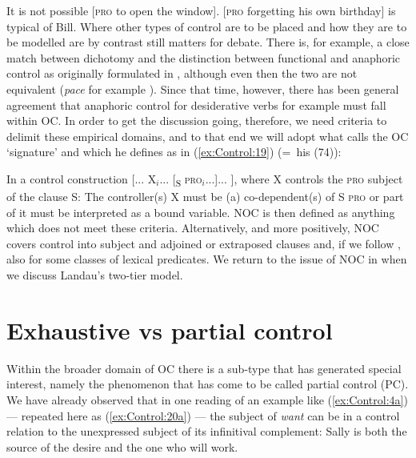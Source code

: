 \documentclass[output=paper,hidelinks]{langscibook}
\begin{document}
\ea\label{ex:Control:18}
\ea\label{ex:Control:18a} It is not possible [\textsc{pro} to open the window].
\ex\label{ex:Control:18b} [\textsc{pro} forgetting his own birthday] is typical of Bill.
\z\z
Where other types of control are to be placed and how they are to be modelled are by contrast still matters for debate. There is, for example, a close match between  dichotomy and the distinction between functional and anaphoric control as originally formulated in \citet{bresnan1982control-complementation}, although even then the two are not equivalent (\emph{pace} for example \citealt[241]{Landau2013}). Since that time, however, there has been general agreement that anaphoric control for desiderative verbs for example must fall within OC. In order to get the discussion going, therefore, we need criteria to delimit these empirical domains, and to that end we will adopt what \citet[29]{Landau2013} calls the OC `signature' and which he defines as in (\ref{ex:Control:19}) (=~his (74)):

\ea\label{ex:Control:19}
In a control construction [... X$_i$... [\textsubscript{S} \textsc{pro}$_i$...]... ], where X controls the
\textsc{pro} subject of the clause S:
\ea\label{ex:Control:19a} The controller(s) X must be (a) co-dependent(s) of S
\ex\label{ex:Control:19b} \textsc{pro} or part of it must be interpreted as a bound variable.
\z\z
NOC is then defined as anything which does not meet these criteria. Alternatively, and more positively, NOC covers control into subject and adjoined or extraposed clauses \citep[38,~(96)]{Landau2013} and, if we follow \citet{Landau2020}, also for some classes of lexical predicates. We return to the issue of NOC in  when we discuss Landau's two-tier model.

\section{Exhaustive vs partial control}
\label{sec:Control:4}

Within the broader domain of OC there is a sub-type that has generated special interest, namely the phenomenon that has come to be called partial control (PC). We have already observed that in one reading of an example like (\ref{ex:Control:4a}) --- repeated here as (\ref{ex:Control:20a}) --- the subject of \emph{want} can be in a control relation to the unexpressed subject of its infinitival complement: Sally is both the source of the desire and the one who will work.
\end{document}
